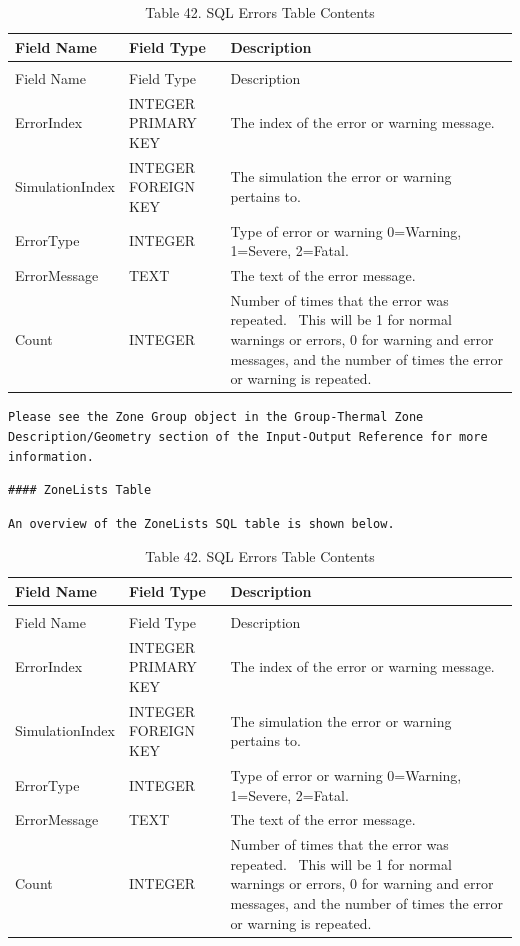 \begin{longtable}[c]{p{1.5in}p{1.5in}p{2.99in}}
\caption{Table 42. SQL Errors Table Contents \label{table:table-42.-sql-errors-table-contents}} \tabularnewline
\toprule 
Field Name & Field Type & Description \tabularnewline
\midrule
\endfirsthead

\caption[]{Table 42. SQL Errors Table Contents} \tabularnewline
\toprule 
Field Name & Field Type & Description \tabularnewline
\midrule
\endhead

ErrorIndex & INTEGER PRIMARY KEY & The index of the error or warning message. \tabularnewline
SimulationIndex & INTEGER FOREIGN KEY & The simulation the error or warning pertains to. \tabularnewline
ErrorType & INTEGER & Type of error or warning 0=Warning, 1=Severe, 2=Fatal. \tabularnewline
ErrorMessage & TEXT & The text of the error message. \tabularnewline
Count & INTEGER & Number of times that the error was repeated.~ This will be 1 for normal warnings or errors, 0 for warning and error messages, and the number of times the error or warning is repeated. \tabularnewline
\bottomrule
\end{longtable}

\begin{lstlisting}
Please see the Zone Group object in the Group-Thermal Zone Description/Geometry section of the Input-Output Reference for more information.
\end{lstlisting}

\begin{lstlisting}
#### ZoneLists Table
\end{lstlisting}

\begin{lstlisting}
An overview of the ZoneLists SQL table is shown below.
\end{lstlisting}

\begin{longtable}[c]{p{1.5in}p{1.5in}p{2.99in}}
\caption{Table 42. SQL Errors Table Contents \label{table:table-42.-sql-errors-table-contents}} \tabularnewline
\toprule 
Field Name & Field Type & Description \tabularnewline
\midrule
\endfirsthead

\caption[]{Table 42. SQL Errors Table Contents} \tabularnewline
\toprule 
Field Name & Field Type & Description \tabularnewline
\midrule
\endhead

ErrorIndex & INTEGER PRIMARY KEY & The index of the error or warning message. \tabularnewline
SimulationIndex & INTEGER FOREIGN KEY & The simulation the error or warning pertains to. \tabularnewline
ErrorType & INTEGER & Type of error or warning 0=Warning, 1=Severe, 2=Fatal. \tabularnewline
ErrorMessage & TEXT & The text of the error message. \tabularnewline
Count & INTEGER & Number of times that the error was repeated.~ This will be 1 for normal warnings or errors, 0 for warning and error messages, and the number of times the error or warning is repeated. \tabularnewline
\bottomrule
\end{longtable}

